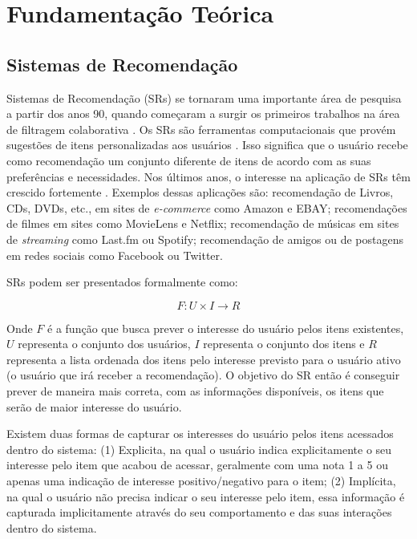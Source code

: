 \chapter{Fundamentação Teórica}

\section{Sistemas de Recomendação}

Sistemas de Recomendação (SRs) se tornaram uma importante área de pesquisa a partir dos anos 90, quando começaram a
surgir os primeiros trabalhos na área de filtragem colaborativa \cite{adomavicius2005toward}. Os SRs são ferramentas
computacionais que provém sugestões de itens personalizadas aos usuários \cite{ricci2011introduction}. Isso significa
que o usuário recebe como recomendação um conjunto diferente de itens de acordo com as suas preferências e necessidades.
Nos últimos anos, o interesse na aplicação de SRs têm crescido fortemente \cite{adomavicius2005toward, beel2016towards}.
Exemplos dessas aplicações são: recomendação de Livros, CDs, DVDs, etc., em sites de \textit{e-commerce} como Amazon e EBAY;
recomendações de filmes em sites como MovieLens e Netflix; recomendação de músicas em sites de \textit{streaming} como Last.fm ou
Spotify; recomendação de amigos ou de postagens em redes sociais como Facebook ou Twitter.

SRs podem ser presentados formalmente como:

\begin{equation}
  F: U \times I \rightarrow R
  \label{eq:context-aware}
\end{equation}

Onde $F$ é a função que busca prever o interesse do usuário pelos itens existentes, $U$ representa o conjunto dos usuários,
$I$ representa o conjunto dos itens e $R$ representa a lista ordenada dos itens pelo interesse previsto para o usuário ativo
(o usuário que irá receber a recomendação). O objetivo do SR então é conseguir prever de maneira mais correta, com as
informações disponíveis, os itens que serão de maior interesse do usuário.

Existem duas formas de capturar os interesses do usuário pelos itens acessados dentro do sistema: (1) Explicita, na
qual o usuário indica explicitamente o seu interesse pelo item que acabou de acessar, geralmente com uma nota 1 a 5 ou
apenas uma indicação de interesse positivo/negativo para o item; (2) Implícita, na qual o usuário não precisa indicar o
seu interesse pelo item, essa informação é capturada implicitamente através do seu comportamento e das suas interações
dentro do sistema.

